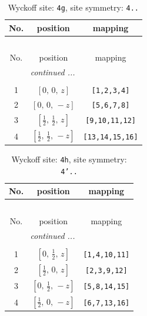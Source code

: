 \documentclass[fleqn,8pt]{jsarticle}
\begin{document}
\renewcommand{\arraystretch}{1.2}
\begin{longtable}{ccc}
\caption{Wyckoff site: {\tt 4g}, site symmetry: {\tt 4..}}
 \\
 \hline \hline
No. & position & mapping \\ \hline \endfirsthead

\multicolumn{2}{l}{\tablename\ \thetable{}} \\
 \hline \hline
No. & position & mapping \\ \hline \endhead

 \hline \hline
\multicolumn{2}{r}{\footnotesize\it continued ...} \\ \endfoot

 \hline \hline
\multicolumn{2}{r}{} \\ \endlastfoot

1 & $\left[ 0,\, 0,\, z \right]$ & {\tt [1,2,3,4]} \\ \hline
2 & $\left[ 0,\, 0,\, - z \right]$ & {\tt [5,6,7,8]} \\ \hline
3 & $\left[ \frac{1}{2},\, \frac{1}{2},\, z \right]$ & {\tt [9,10,11,12]} \\ \hline
4 & $\left[ \frac{1}{2},\, \frac{1}{2},\, - z \right]$ & {\tt [13,14,15,16]} \\
\end{longtable}
\renewcommand{\arraystretch}{1.2}
\begin{longtable}{ccc}
\caption{Wyckoff site: {\tt 4h}, site symmetry: {\tt 4'..}}
 \\
 \hline \hline
No. & position & mapping \\ \hline \endfirsthead

\multicolumn{2}{l}{\tablename\ \thetable{}} \\
 \hline \hline
No. & position & mapping \\ \hline \endhead

 \hline \hline
\multicolumn{2}{r}{\footnotesize\it continued ...} \\ \endfoot

 \hline \hline
\multicolumn{2}{r}{} \\ \endlastfoot

1 & $\left[ 0,\, \frac{1}{2},\, z \right]$ & {\tt [1,4,10,11]} \\ \hline
2 & $\left[ \frac{1}{2},\, 0,\, z \right]$ & {\tt [2,3,9,12]} \\ \hline
3 & $\left[ 0,\, \frac{1}{2},\, - z \right]$ & {\tt [5,8,14,15]} \\ \hline
4 & $\left[ \frac{1}{2},\, 0,\, - z \right]$ & {\tt [6,7,13,16]} \\
\end{longtable}
\end{document}
